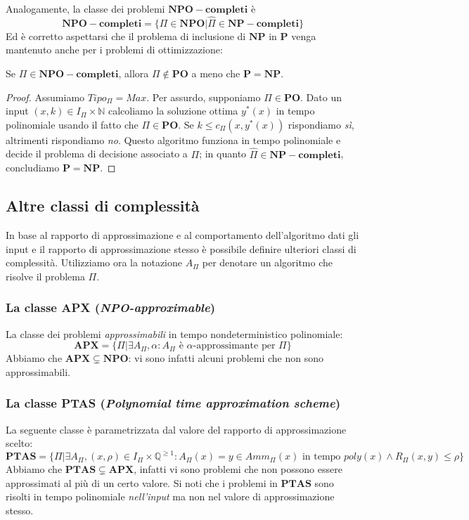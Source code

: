 \noindent
Analogamente, la classe dei problemi $\mathbf{NPO-completi}$ è 
$$
\mathbf{NPO-completi} = \{\Pi \in \mathbf{NPO} | \hat{\Pi} \in \mathbf{NP-completi}\}
$$
Ed è corretto aspettarsi che il problema di inclusione di $\mathbf{NP}$ in $\mathbf{P}$ 
venga mantenuto anche per i problemi di ottimizzazione:
\begin{theorem}
  Se $\Pi \in \mathbf{NPO-completi}$, allora $\Pi \notin \mathbf{PO}$ a meno che
$\mathbf{P} = \mathbf{NP}$.
\end{theorem}

\begin{proof}
Assumiamo $Tipo_{\Pi} = Max$. Per assurdo, supponiamo $\Pi \in \mathbf{PO}$.
Dato un input $(x,k) \in I_{\Pi} \times \mathbb{N}$ calcoliamo la soluzione
ottima $y^*(x)$ in tempo polinomiale usando il fatto che $\Pi \in \mathbf{PO}$.
Se $k \leq c_{\Pi}(x, y^*(x))$ rispondiamo \textit{sì}, altrimenti rispondiamo
\textit{no}. Questo algoritmo funziona in tempo polinomiale e decide il problema
di decisione associato a $\Pi$; in quanto $\hat{\Pi} \in \mathbf{NP-completi}$,
concludiamo $\mathbf{P} = \mathbf{NP}$.
\end{proof}

\subsection{Altre classi di complessità}
In base al rapporto di approssimazione e al comportamento dell'algoritmo dati
gli input e il rapporto di approssimazione stesso è possibile definire ulteriori
classi di complessità. Utilizziamo ora la notazione $A_{\Pi}$ per denotare un
algoritmo che risolve il problema $\Pi$.

\subsubsection{La classe {\bf APX} ({\it NPO-approximable})}
La classe dei problemi \textit{approssimabili} in tempo nondeterministico polinomiale:
$$
\mathbf{APX} = \{\Pi | \exists A_{\Pi}, \alpha: A_{\Pi} \text{ è } \alpha\text{-approssimante per } \Pi\}
$$
Abbiamo che $\mathbf{APX} \subsetneq \mathbf{NPO}$: vi sono infatti alcuni
problemi che non sono approssimabili. 

\subsubsection{La classe {\bf PTAS} ({\it Polynomial time approximation scheme})}
La seguente classe è parametrizzata dal valore del rapporto di approssimazione 
scelto:
$$
\mathbf{PTAS} = \{\Pi | \exists A_{\Pi},  (x, \rho) \in I_{\Pi} \times \mathbb{Q}^{\geq 1}:
A_{\Pi}(x) = y \in Amm_{\Pi}(x) \text{ in tempo } poly(x) \land R_{\Pi}(x,y) \leq \rho \} 
$$
Abbiamo che  $\mathbf{PTAS} \subsetneq \mathbf{APX}$, infatti vi sono problemi
che non possono essere approssimati al più di un certo valore. Si noti che i
problemi in $\mathbf{PTAS}$ sono risolti in tempo polinomiale
\textit{nell'input} ma non nel valore di approssimazione stesso.

